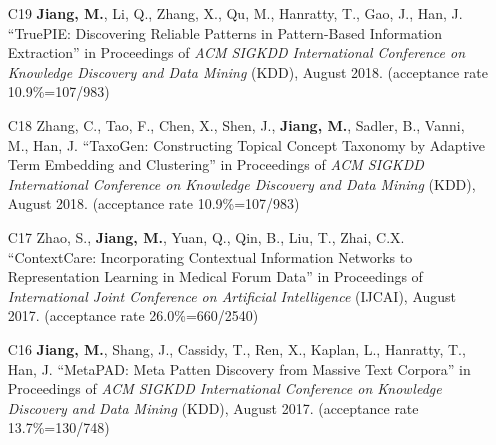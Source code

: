 \documentclass[10pt]{article}
\newenvironment{myindentpar}[1]%
{\begin{list}{}%
         {\setlength{\leftmargin}{#1}}%
         \item[]%
}
{\end{list}}
\newcounter{list}
\begin{document}
\begin{myindentpar}{0.00cm}
\begin{enumerate}[leftmargin=.5cm]
\vspace{-0.1cm}

\item[C19] \textbf{Jiang, M.}, Li, Q., Zhang, X., Qu, M., Hanratty, T., Gao, J., Han, J. ``TruePIE: Discovering Reliable Patterns in Pattern-Based Information Extraction'' in Proceedings of \emph{ACM SIGKDD International Conference on Knowledge Discovery and Data Mining} (KDD), August 2018. (acceptance rate 10.9\%=107/983)

\vspace{-0.1cm}

\item[C18] Zhang, C., Tao, F., Chen, X., Shen, J., \textbf{Jiang, M.}, Sadler, B., Vanni, M., Han, J. ``TaxoGen: Constructing Topical Concept Taxonomy by Adaptive Term Embedding and Clustering'' in Proceedings of \emph{ACM SIGKDD International Conference on Knowledge Discovery and Data Mining} (KDD), August 2018. (acceptance rate 10.9\%=107/983)

\vspace{-0.1cm}

\item[C17] Zhao, S., \textbf{Jiang, M.}, Yuan, Q., Qin, B., Liu, T., Zhai, C.X. ``ContextCare: Incorporating Contextual Information Networks to Representation Learning in Medical Forum Data'' in Proceedings of \emph{International Joint Conference on Artificial Intelligence} (IJCAI), August 2017. (acceptance rate 26.0\%=660/2540)

\vspace{-0.1cm}

\item[C16] \textbf{Jiang, M.}, Shang, J., Cassidy, T., Ren, X., Kaplan, L., Hanratty, T., Han, J. ``MetaPAD: Meta Patten Discovery from Massive Text Corpora'' in Proceedings of \emph{ACM SIGKDD International Conference on Knowledge Discovery and Data Mining} (KDD), August 2017. (acceptance rate 13.7\%=130/748)


\end{enumerate}
\end{myindentpar}
\end{document}
